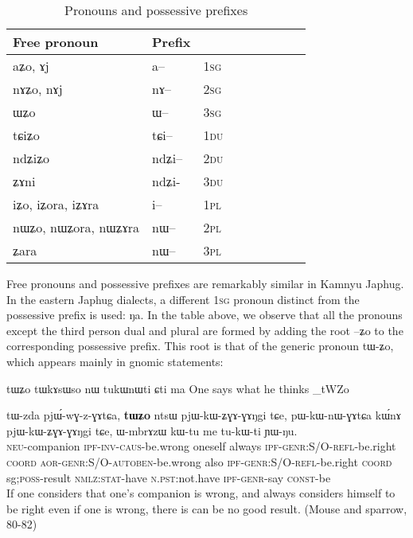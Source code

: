 \documentclass[oldfontcommands,oneside,a4paper,11pt]{memoir}
\newcommand{\ipa}[1]{{\phon #1}} %
\newcommand{\aor}{\textsc{aor}}
\newcommand{\auto}{\textsc{autoben}}
\newcommand{\caus}{\textsc{caus}}
\newcommand{\coord}{\textsc{coord}}
\newcommand{\const}{\textsc{const}}
\newcommand{\du}{\textsc{du}}
\newcommand{\genr}{\textsc{genr}}
\newcommand{\inv}{\textsc{inv}}
\newcommand{\ipf}{\textsc{ipf}}
\newcommand{\neu}{\textsc{neu}}
\newcommand{\nmlz}{\textsc{nmlz}}
\newcommand{\npst}{\textsc{n.pst}}
\newcommand{\pl}{\textsc{pl}}
\newcommand{\poss}{\textsc{poss}}
\newcommand{\refl}{\textsc{refl}}
\newcommand{\sg}{\textsc{sg}}
\newcommand{\stat}{\textsc{stat}}
\begin{document}
\begin{table}[H] \centering
\caption{Pronouns and possessive prefixes }\label{tab:pronoun}
\begin{tabular}{lllllllll} \toprule
 Free pronoun & Prefix & \\
\midrule
 \ipa{aʑo},    \ipa{ɤj} &	\ipa{a--}  &		1\sg{} \\
\ipa{nɤʑo},  \ipa{nɤj} &	\ipa{nɤ--}  &			2\sg{} \\
\ipa{ɯʑo}  &	\ipa{ɯ--}  &			3\sg{} \\
\ipa{tɕiʑo}  &	\ipa{tɕi--}  &			1\du{} \\
\ipa{ndʑiʑo}  &	\ipa{ndʑi--}  &		2\du{} \\	
\ipa{ʑɤni}  &	\ipa{ndʑi-}  &		3\du{} \\	
\ipa{iʑo}, \ipa{iʑora},   \ipa{iʑɤra}   &	\ipa{i--}  &			1\pl{} \\
\ipa{nɯʑo}, \ipa{nɯʑora},   \ipa{nɯʑɤra}  &	\ipa{nɯ--}  &			2\pl{} \\
\ipa{ʑara}  &	\ipa{nɯ--}  &			3\pl{} \\
\bottomrule
\end{tabular}
\end{table}Free pronouns and possessive prefixes are remarkably similar in Kamnyu Japhug. In the eastern Japhug dialects, a different 1\sg{} pronoun distinct from the possessive prefix  is used: \ipa{ŋa}. In the table above, we observe that all the pronouns except the third person dual and plural are formed by adding the root --\ipa{ʑo} to the corresponding possessive prefix. This root is that of the generic pronoun \ipa{tɯ-ʑo}, which appears mainly in gnomic statements:

tɯʑo tɯkɤsɯso nɯ tukɯnɯti ɕti ma
One says what he thinks
\ipa{8_tWZo}

\begin{exe}
\ex
\gll 
\ipa{tɯ-zda} \ipa{pjɯ́-wɣ-z-ɣɤtɕa,} \textbf{\ipa{tɯʑo}}  \ipa{ntsɯ}  \ipa{pjɯ-kɯ-ʑɣɤ-ɣɤŋgi}   	\ipa{tɕe,}  \ipa{pɯ-kɯ-nɯ-ɣɤtɕa} 	\ipa{kɯ́nɤ}   	\ipa{pjɯ-kɯ-ʑɣɤ-ɣɤŋgi}   	\ipa{tɕe,}    \ipa{ɯ-mbrɤzɯ}   	\ipa{kɯ-tu}   	\ipa{me}  	\ipa{tu-kɯ-ti}   	\ipa{ɲɯ-ŋu.}   \\
\neu{}-companion \ipf{}-\inv{}-\caus{}-be.wrong oneself always \ipf{}-\genr{}:S/O-\refl{}-be.right \coord{} \aor{}-\genr{}:S/O-\auto{}-be.wrong also \ipf{}-\genr{}:S/O-\refl{}-be.right \coord{} \3sg{};\poss{}-result \nmlz{}:\stat{}-have \npst{}:not.have \ipf{}-\genr-say \const{}-be \\
\glt  If one considers that one's companion is wrong, and always considers himself to be right even if one is wrong, there is can be no good result. (Mouse and sparrow, 80-82)
\end{exe} 
\end{document}
